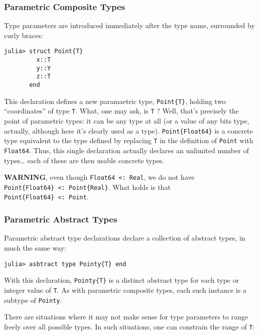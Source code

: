 \documentclass[
]{article}
\begin{document}
\hypertarget{parametric-composite-types}{%
\subsubsection{Parametric Composite
Types}\label{parametric-composite-types}}

Type parameters are introduced immediately after the type name,
surrounded by curly braces:

\begin{verbatim}
julia> struct Point{T}
         x::T
         y::Y
         z::T
       end
\end{verbatim}

This declaration defines a new paramaetric type, \texttt{Point\{T\}},
holding two ``coordinates'' of type \texttt{T}. What, one may ask, is
\texttt{T} ? Well, that's precisely the point of parametric types: it
can be any type at all (or a value of any bits type, actually, although
here it's clearly used as a type). \texttt{Point\{Float64\}} is a
concrete type equivalent to the type defined by replacing \texttt{T} in
the definition of \texttt{Point} with \texttt{Float64}. Thus, this
single declaration actually declares an unlimited number of
types\ldots{} each of these are then usable concrete types.

\textbf{WARNING}, even though \texttt{Float64\ \textless{}:\ Real}, we
do not have \texttt{Point\{Float64\}\ \textless{}:\ Point\{Real\}}. What
holds is that \texttt{Point\{Float64\}\ \textless{}:\ Point}.

\hypertarget{parametric-abstract-types}{%
\subsubsection{Parametric Abstract
Types}\label{parametric-abstract-types}}

Parametric abstract type declarations declare a collection of abstract
types, in much the same way:

\begin{verbatim}
julia> asbtract type Pointy{T} end
\end{verbatim}

With this declaration, \texttt{Pointy\{T\}} is a distinct abstract type
for each type or integer value of \texttt{T}. As with parametric
composite types, each such instance is a subtype of \texttt{Pointy}.

There are situations where it may not make sense for type parameters to
range freely over all possible types. In such situations, one can
constrain the range of \texttt{T}:
\end{document}
